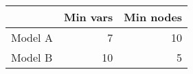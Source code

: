 
\begin{tabular}{l|r|r}
\hline
  & Min vars & Min nodes\\
\hline
Model A & 7 & 10\\
\hline
Model B & 10 & 5\\
\hline
\end{tabular}